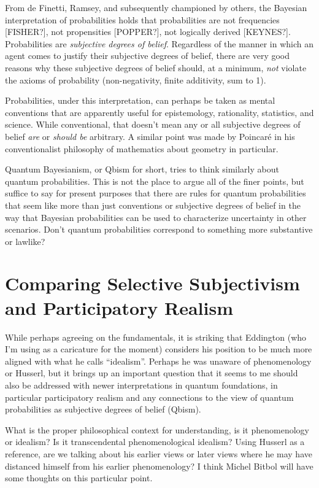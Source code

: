 \documentclass{article}
\begin{document}
From de Finetti, Ramsey, and subsequently championed by others, the Bayesian interpretation of probabilities holds that probabilities are not frequencies [FISHER?], not propensities [POPPER?], not logically derived [KEYNES?].  Probabilities are \emph{subjective degrees of belief}. Regardless of the manner in which an agent comes to justify their subjective degrees of belief, there are very good reasons why these subjective degrees of belief should, at a minimum, \emph{not} violate the axioms of probability (non-negativity, finite additivity, sum to 1).

Probabilities, under this interpretation, can perhaps be taken as mental conventions that are apparently useful for epistemology, rationality, statistics, and science.  While conventional, that doesn't mean any or all subjective degrees of belief \emph{are} or \emph{should be} arbitrary.  A similar point was made by Poincar\'e in his conventionalist philosophy of mathematics about geometry in particular.  

Quantum Bayesianism, or Qbism for short, tries to think similarly about quantum probabilities.  This is not the place to argue all of the finer points, but suffice to say for present purposes that there are rules for quantum probabilities that seem like more than just conventions or subjective degrees of belief in the way that Bayesian probabilities can be used to characterize uncertainty in other scenarios.  Don't quantum probabilities correspond to something more substantive or lawlike?


\section{Comparing Selective Subjectivism and Participatory Realism}

While perhaps agreeing on the fundamentals, it is striking that Eddington (who I'm using as a caricature for the moment) considers his position to be much more aligned with what he calls ``idealism''.  Perhaps he was unaware of phenomenology or Husserl, but it brings up an important question that it seems to me should also be addressed with newer interpretations in quantum foundations, in particular participatory realism and any connections to the view of quantum probabilities as subjective degrees of belief (Qbism).

What is the proper philosophical context for understanding, is it phenomenology or idealism?  Is it transcendental phenomenological idealism?  Using Husserl as a reference, are we talking about his earlier views or later views where he may have distanced himself from his earlier phenomenology?  I think Michel Bitbol will have some thoughts on this particular point.
\end{document}
